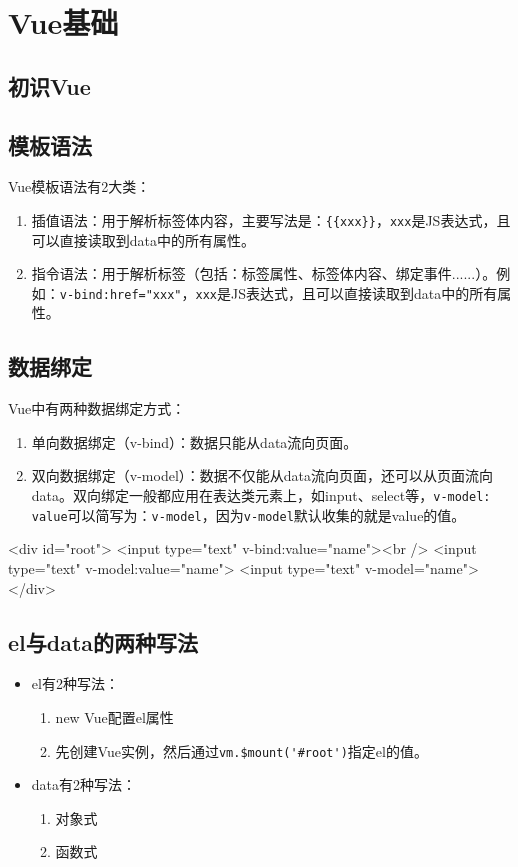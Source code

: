 \chapter{Vue基础}
\section{初识Vue}

\section{模板语法}
Vue模板语法有2大类：
\begin{enumerate}
    \item 插值语法：用于解析标签体内容，主要写法是：\verb|{{xxx}}|，\verb|xxx|是JS表达式，且可以直接读取到data中的所有属性。
    \item 指令语法：用于解析标签（包括：标签属性、标签体内容、绑定事件......）。例如：\verb|v-bind:href="xxx"|，\verb|xxx|是JS表达式，且可以直接读取到data中的所有属性。
\end{enumerate}
\section{数据绑定}

Vue中有两种数据绑定方式：
\begin{enumerate}
    \item 单向数据绑定（v-bind）：数据只能从data流向页面。
    \item 双向数据绑定（v-model）：数据不仅能从data流向页面，还可以从页面流向data。双向绑定一般都应用在表达类元素上，如input、select等，\verb|v-model: value|可以简写为：\verb|v-model|，因为\verb|v-model|默认收集的就是value的值。
\end{enumerate}
\begin{html}
<div id="root">
    <input type="text" v-bind:value="name"><br />
    <input type="text" v-model:value="name">
    <input type="text" v-model="name">
</div>
\end{html}

\section{el与data的两种写法}
\begin{itemize}
    \item el有2种写法：
    \begin{enumerate}
        \item new Vue配置el属性
        \item 先创建Vue实例，然后通过\verb|vm.$mount('#root')|指定el的值。
    \end{enumerate}
    \item data有2种写法：
    \begin{enumerate}
        \item 对象式
        \item 函数式
    \end{enumerate}
\end{itemize}

